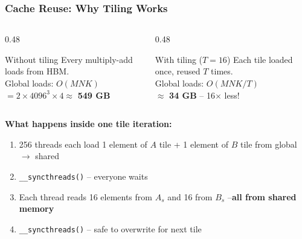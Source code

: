 \documentclass[aspectratio=169]{beamer}
\begin{document}
\begin{frame}
	\frametitle{Cache Reuse: Why Tiling Works}
	\begin{columns}
		\begin{column}{0.48\textwidth}
			\begin{alertblock}{Without tiling}
				Every multiply-add loads from HBM. \\[0.3em]
				Global loads: $O(MNK)$ \\
				$= 2 \times 4096^3 \times 4 \approx$ \textbf{549 GB}
			\end{alertblock}
		\end{column}
		\begin{column}{0.48\textwidth}
			\begin{exampleblock}{With tiling ($T = 16$)}
				Each tile loaded once, reused $T$ times. \\[0.3em]
				Global loads: $O(MNK / T)$ \\
				$\approx$ \textbf{34 GB} -- 16$\times$ less!
			\end{exampleblock}
		\end{column}
	\end{columns}
	\vspace{0.8em}
	\textbf{What happens inside one tile iteration:}
	\begin{enumerate}
		\item 256 threads each load 1 element of $A$ tile + 1 element of $B$ tile from global $\rightarrow$ shared
		\item \texttt{\_\_syncthreads()} -- everyone waits
		\item Each thread reads 16 elements from $A_s$ and 16 from $B_s$ --\textbf{all from shared memory}
		\item \texttt{\_\_syncthreads()} -- safe to overwrite for next tile
	\end{enumerate}
\end{frame}
\end{document}
